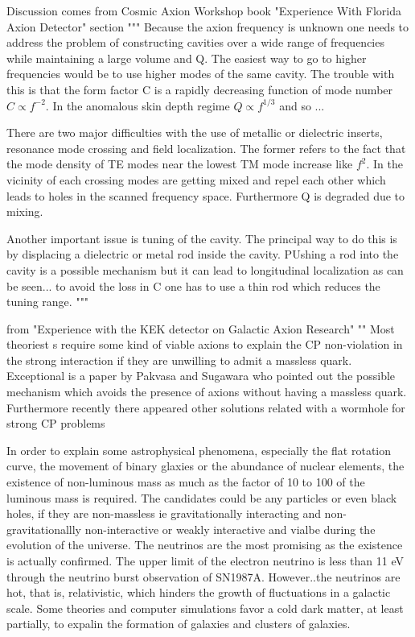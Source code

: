 \documentclass[12pt, twoside]{book}
\begin{document}
Discussion comes from Cosmic Axion Workshop book "Experience With Florida Axion Detector" section
"""
Because the axion frequency is unknown one needs to address the problem of constructing cavities over a wide range of frequencies while maintaining a large volume and Q. The easiest way to go to higher frequencies would be to use higher modes of the same cavity. The trouble with this is that the form factor C is a rapidly decreasing function of mode number $C \propto f^{-2}$. In the anomalous skin depth regime $Q \propto f^{1/3}$ and so ...

There are two major difficulties with the use of metallic or dielectric inserts, resonance mode crossing and field localization. The former refers to the fact that the mode density of TE modes near the lowest TM mode increase like $f^2$. In the vicinity of each crossing modes are getting mixed and repel each other which leads to holes in the scanned frequency space. Furthermore Q is degraded due to mixing.

Another important issue is tuning of the cavity. The principal way to do this is by displacing a dielectric or metal rod inside the cavity. PUshing a rod into the cavity is a possible mechanism but it can lead to longitudinal localization as can be seen... to avoid the loss in C one has to use a thin rod which reduces the tuning range. 
"""

from "Experience with the KEK detector on Galactic Axion Research"
""
Most theoriest s require some kind of viable axions to explain the CP non-violation in the strong interaction if they are unwilling to admit a massless quark. Exceptional is a paper by Pakvasa and Sugawara who pointed out the possible mechanism which avoids the presence of axions without having a massless quark. Furthermore recently there appeared other solutions related with a wormhole for strong CP problems

In order to explain some astrophysical phenomena, especially the flat rotation curve, the movement of binary glaxies or the abundance of nuclear elements, the existence of non-luminous mass as much as the factor of 10 to 100 of the luminous mass is required. The candidates could be any particles or even black holes, if they are non-massless ie gravitationally interacting and non-gravitationallly non-interactive or weakly interactive and vialbe during the evolution of the universe. The neutrinos are the most promising as the existence is actually confirmed. The upper limit of the electron neutrino is less than 11 eV through the neutrino burst observation of SN1987A. However..the neutrinos are hot, that is, relativistic, which hinders the growth of fluctuations in a galactic scale. Some theories and computer simulations favor a cold dark matter, at least partially, to expalin the formation of galaxies and clusters of galaxies.
\end{document}
